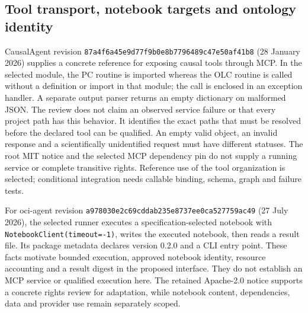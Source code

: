 \subsection{Tool transport, notebook targets and ontology identity}
CausalAgent revision
\texttt{87a4f6a45e9d77f9b0e8}\allowbreak\texttt{b7796489c47e50af41b8}
(28 January 2026) supplies a concrete reference for exposing causal tools through
MCP. In the selected module, the PC routine is imported whereas the OLC routine
is called without a definition or import in that module; the call is enclosed
in an exception handler. A separate output parser returns an empty dictionary
on malformed JSON. The review does not claim an observed service failure or
that every project path has this behavior. It identifies the exact paths that
must be resolved before the declared tool can be qualified. An empty valid
object, an invalid response and a scientifically unidentified request must have
different statuses. The root MIT notice and the selected MCP dependency pin do
not supply a running service or complete transitive rights. Reference use of
the tool organization is selected; conditional integration needs callable
binding, schema, graph and failure tests.~\citep{exec13_data_causalagent_code,exec25_agents_choice}

For oci-agent revision
\texttt{a978030e2c69cddab235}\allowbreak\texttt{e8737ee0ca527759ac49}
(27 July 2026), the selected runner executes a specification-selected notebook
with \texttt{NotebookClient(timeout=-1)}, writes the executed notebook, then
reads a result file. Its package metadata declares version 0.2.0 and a CLI
entry point. These facts motivate bounded execution, approved notebook
identity, resource accounting and a result digest in the proposed interface.
They do not establish an MCP service or qualified execution here. The retained
Apache-2.0 notice supports a concrete rights review for adaptation, while
notebook content, dependencies, data and provider use remain separately
scoped.~\citep{exec13_data_oci_code,exec25_agents_choice}

